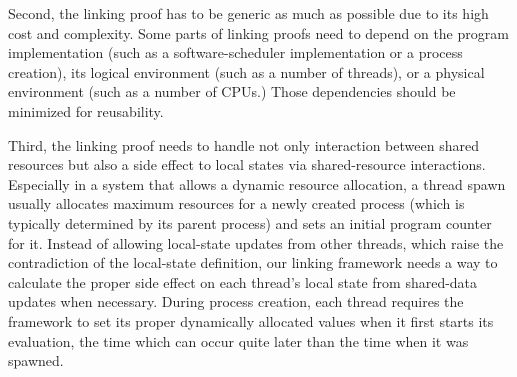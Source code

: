 Second,  
the linking proof has to be generic as much as possible due to its high cost and complexity. 
Some parts of  linking proofs need to depend
on the program implementation (such as a software-scheduler implementation or a process creation),
 its logical environment (such as a number of threads),
 or a physical environment (such as a number of CPUs.)
Those dependencies should be minimized for reusability.

Third, 
the  linking proof 
needs to handle not only interaction between shared resources but also a side effect to local states via shared-resource interactions. 
Especially in a system that allows a dynamic resource allocation,
a thread spawn usually allocates maximum resources for a newly created process (which is typically determined by its parent process) and sets an initial program counter for it.
Instead of allowing local-state updates from other threads, which raise the contradiction of the local-state definition, 
our linking framework needs a way to calculate the proper side effect on each thread's local state from shared-data updates when necessary. 
During process creation, each thread requires the framework to set its proper dynamically allocated values when it first starts its evaluation,
the time which can occur quite later than the time when it was spawned. 








